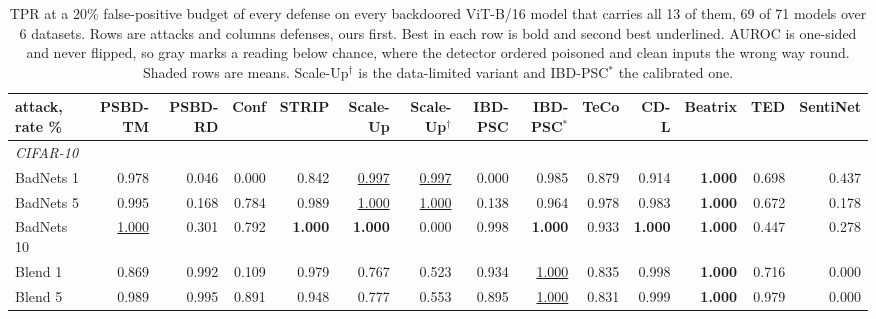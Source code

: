 \begin{table}[htbp]
\centering
\small
\caption{TPR at a 20\% false-positive budget of every defense on every backdoored ViT-B/16 model that carries all 13 of them, 69 of 71 models over 6 datasets. Rows are attacks and columns defenses, ours first. Best in each row is bold and second best underlined. AUROC is one-sided and never flipped, so gray marks a reading below chance, where the detector ordered poisoned and clean inputs the wrong way round. Shaded rows are means. Scale-Up$^\dagger$ is the data-limited variant and IBD-PSC$^\ast$ the calibrated one.}
\label{tab:detectors-tpr20}
\begin{adjustbox}{max width=\textwidth}
\begin{tabular}{lrrrrrrrrrrrrr}
\toprule
attack, rate \% & PSBD-TM & PSBD-RD & Conf & STRIP & Scale-Up & Scale-Up$^\dagger$ & IBD-PSC & IBD-PSC$^\ast$ & TeCo & CD-L & Beatrix & TED & SentiNet \\
\midrule
\multicolumn{14}{l}{\emph{CIFAR-10}} \\
BadNets 1 & 0.978 & \textcolor{black!45}{0.046} & \textcolor{black!45}{0.000} & 0.842 & \underline{0.997} & \underline{0.997} & \textcolor{black!45}{0.000} & 0.985 & 0.879 & 0.914 & \textbf{1.000} & 0.698 & \textcolor{black!45}{0.437} \\
BadNets 5 & 0.995 & \textcolor{black!45}{0.168} & 0.784 & 0.989 & \underline{1.000} & \underline{1.000} & \textcolor{black!45}{0.138} & 0.964 & 0.978 & 0.983 & \textbf{1.000} & 0.672 & \textcolor{black!45}{0.178} \\
BadNets 10 & \underline{1.000} & \textcolor{black!45}{0.301} & 0.792 & \textbf{1.000} & \textbf{1.000} & \textcolor{black!45}{0.000} & 0.998 & \textbf{1.000} & 0.933 & \textbf{1.000} & \textbf{1.000} & \textcolor{black!45}{0.447} & \textcolor{black!45}{0.278} \\
Blend 1 & 0.869 & 0.992 & \textcolor{black!45}{0.109} & 0.979 & 0.767 & 0.523 & 0.934 & \underline{1.000} & 0.835 & 0.998 & \textbf{1.000} & 0.716 & \textcolor{black!45}{0.000} \\
Blend 5 & 0.989 & 0.995 & 0.891 & 0.948 & 0.777 & 0.553 & 0.895 & \underline{1.000} & 0.831 & 0.999 & \textbf{1.000} & 0.979 & \textcolor{black!45}{0.000} \\

\end{tabular}
\end{adjustbox}
\end{table}
